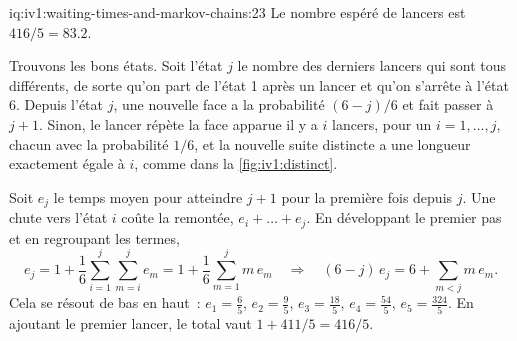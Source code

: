 \begin{solution}{iq:iv1:waiting-times-and-markov-chains:23}
Le nombre espéré de lancers est $416/5 = 83.2$.

Trouvons les bons états. Soit l'état $j$ le nombre des derniers lancers qui sont tous différents, de sorte qu'on part de l'état 1 après un lancer et qu'on s'arrête à l'état 6. Depuis l'état $j$, une nouvelle face a la probabilité $(6 - j)/6$ et fait passer à $j + 1$. Sinon, le lancer répète la face apparue il y a $i$ lancers, pour un $i = 1, \dots, j$, chacun avec la probabilité $1/6$, et la nouvelle suite distincte a une longueur exactement égale à $i$, comme dans la \cref{fig:iv1:distinct}.

Soit $e_j$ le temps moyen pour atteindre $j + 1$ pour la première fois depuis $j$. Une chute vers l'état $i$ coûte la remontée, $e_i + \dots + e_j$. En développant le premier pas et en regroupant les termes,
\[
e_j = 1 + \frac16 \sum_{i=1}^{j} \sum_{m=i}^{j} e_m = 1 + \frac16 \sum_{m=1}^{j} m\,e_m \quad\Rightarrow\quad (6 - j)\,e_j = 6 + \sum_{m < j} m\,e_m.
\]
Cela se résout de bas en haut~: $e_1 = \tfrac65$, $e_2 = \tfrac95$, $e_3 = \tfrac{18}{5}$, $e_4 = \tfrac{54}{5}$, $e_5 = \tfrac{324}{5}$. En ajoutant le premier lancer, le total vaut $1 + 411/5 = 416/5$.

\begin{omfigure}

\label{fig:iv1:distinct}
\end{omfigure}

\end{solution}

